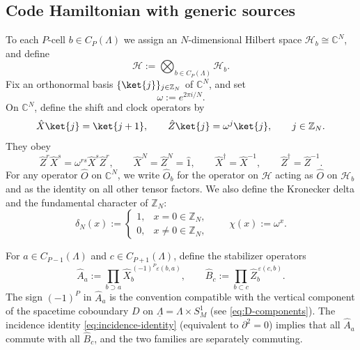 \documentclass[dvipsnames,a4paper]{article}
\numberwithin{equation}{section}
\theoremstyle{definition}
\theoremstyle{remark}
\begin{document}
\subsection{Code Hamiltonian with generic sources}

To each \(P\)-cell \(b\in C_P(\Lambda)\) we assign an \(N\)-dimensional Hilbert space
\(\mathcal H_b\cong\mathbb C^N\), and define
\begin{equation}
	\mathcal H
	:=
	\bigotimes_{b\in C_P(\Lambda)}\mathcal H_b .
	\label{eq:H-total}
\end{equation}
Fix an orthonormal basis \(\{\ket{j}\}_{j\in\mathbb Z_N}\) of \(\mathbb C^N\), and set
\begin{equation}
\omega:=e^{2\pi i/N}.
\end{equation}
On \(\mathbb C^N\), define the shift and clock operators by
\begin{equation}
	\hat X\ket{j}=\ket{j+1},
	\qquad
	\hat Z\ket{j}=\omega^j\ket{j},
	\qquad
	j\in\mathbb Z_N.
	\label{eq:XZ}
\end{equation}
They obey
\begin{equation}
	\hat Z^r\hat X^s=\omega^{rs}\hat X^s\hat Z^r,
	\qquad
	\hat X^N=\hat Z^N=\hat 1,
	\qquad
	\hat X^\dagger=\hat X^{-1},
	\qquad
	\hat Z^\dagger=\hat Z^{-1}.
	\label{eq:Weyl}
\end{equation}
For any operator \(\hat O\) on \(\mathbb C^N\), we write \(\hat O_b\) for the operator on
\(\mathcal H\) acting as \(\hat O\) on \(\mathcal H_b\) and as the identity on all other
tensor factors. We also define the Kronecker delta and the fundamental character of $\mathbb Z_N$:
\begin{equation}
	\delta_N(x)
	:=
	\begin{cases}
		1,& x=0\in\mathbb Z_N,\\
		0,& x\neq0\in\mathbb Z_N,
	\end{cases}
	\qquad
	\chi(x):=\omega^x .
	\label{eq:delta-and-character}
\end{equation}

For \(a\in C_{P-1}(\Lambda)\) and \(c\in C_{P+1}(\Lambda)\), define the stabilizer operators
\begin{equation}
	\hat A_a
	:=
	\prod_{b\supset a}\hat X_b^{\,(-1)^P\varepsilon(b,a)},
	\qquad
	\hat B_c
	:=
	\prod_{b\subset c}\hat Z_b^{\,\varepsilon(c,b)} .
	\label{eq:AB}
\end{equation}
The sign \((-1)^P\) in \(\hat A_a\) is the convention compatible with the vertical
component of the spacetime coboundary \(D\) on \(\underline\Lambda=\Lambda\times S^1_M\) (see \eqref{eq:D-components}). The incidence identity \eqref{eq:incidence-identity} (equivalent to \(\partial^2=0\)) implies
that all \(\hat A_a\) commute with all \(\hat B_c\), and the two families are separately
commuting.
\end{document}
